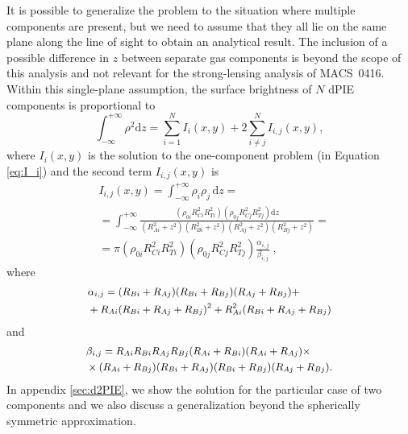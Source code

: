 \documentclass[twocolumn]{aastex61}
\begin{document}
It is possible to generalize the problem to the situation where multiple
components are present, but we need to assume that they all lie on the
same plane along the line of sight to obtain an analytical result.
The inclusion of a possible difference in $z$ between separate gas components is beyond the scope of this analysis
and not relevant for the strong-lensing analysis of MACS~0416.
Within this single-plane assumption, the surface brightness of $N$ dPIE components is proportional
to
\begin{equation}
\int_{-\infty}^{+\infty}\!\!\! \rho^2 \text{d}z = 
\sum_{i = 1}^{N} I_i(x,y) + 2 \sum_{i \neq j}^{N} I_{i,j}(x,y),
\label{eq:dNPIE}
\end{equation}
where $I_i(x,y)$ is the solution to the one-component problem (in Equation \ref{eq:I_i})
and the second term $I_{i,j}(x,y)$ is
\begin{equation}
\begin{split}
&I_{i,j}(x,y) = \int_{-\infty}^{+\infty}\!\!\! \rho_i \rho_j \, \text{d}z = \\
& = \int_{-\infty}^{+\infty}\!\!\! \frac{ \left( \rho_{0i} R_{Ci}^2 R_{Ti}^2 \right)
\left( \rho_{0j} R_{Cj}^2 R_{Tj}^2 \right) \text{d}z }{
         ( R_{Ai}^2 + z^2 )
         ( R_{Bi}^2 + z^2 )
         ( R_{Aj}^2 + z^2 )
         ( R_{Bj}^2 + z^2 ) } = \\
& = \pi \left( \rho_{0i} R_{Ci}^2 R_{Ti}^2 \right)
\left( \rho_{0j} R_{Cj}^2 R_{Tj}^2 \right) \frac{\alpha_{i,j}}{\beta_{i,j}}\; ,
\end{split}
\end{equation}
where
\begin{equation}
\small
\begin{split}
&\alpha_{i,j} = (R_{Bi}+R_{Aj}) (R_{Bi}+R_{Bj}) (R_{Aj}+R_{Bj}) + \\
& +  R_{Ai} (R_{Bi}+R_{Aj}+R_{Bj})^2  + R_{Ai}^2 (R_{Bi}+R_{Aj}+R_{Bj})
\end{split}
\end{equation}
and
\begin{equation}
\small
\begin{split}
&\beta_{i,j} = R_{Ai} R_{Bi} R_{Aj} R_{Bj} (R_{Ai}+R_{Bi}) (R_{Ai}+R_{Aj}) \times \\
& \times (R_{Ai}+R_{Bj}) (R_{Bi}+R_{Aj}) (R_{Bi}+R_{Bj}) (R_{Aj}+R_{Bj}).
\end{split}
\end{equation}
In appendix \ref{sec:d2PIE}, we show the solution for the particular case of two
components and we also discuss a generalization beyond the spherically
symmetric approximation.
\end{document}
